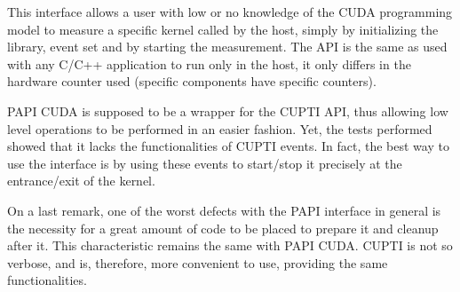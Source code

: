 This interface allows a user with low or no knowledge of the CUDA programming model to measure a specific kernel called by the host, simply by initializing the library, event set and by starting the measurement. The API is the same as used with any C/C++ application to run only in the host, it only differs in the hardware counter used (specific components have specific counters).

PAPI CUDA is supposed to be a wrapper for the CUPTI API, thus allowing low level operations to be performed in an easier fashion. Yet, the tests performed showed that it lacks the functionalities of CUPTI events. In fact, the best way to use the interface is by using these events to start/stop it precisely at the entrance/exit of the kernel.

On a last remark, one of the worst defects with the PAPI interface in general is the necessity for a great amount of code to be placed to prepare it and cleanup after it. This characteristic remains the same with PAPI CUDA. CUPTI is not so verbose, and is, therefore, more convenient to use, providing the same functionalities.
